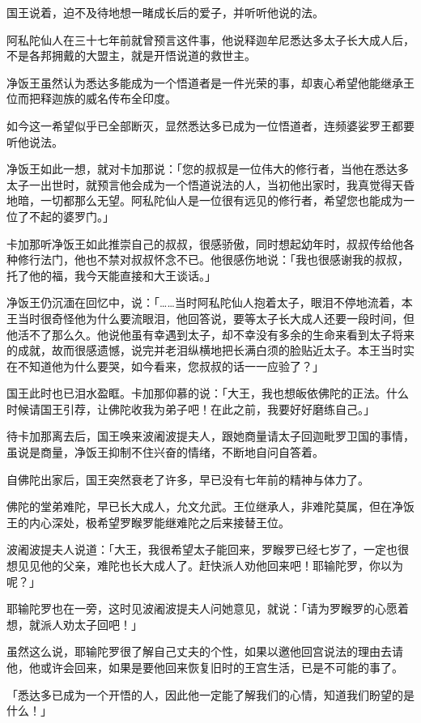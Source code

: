 \documentclass[twoside,openany]{book}
\begin{document}
国王说着，迫不及待地想一睹成长后的爱子，并听听他说的法。

阿私陀仙人在三十七年前就曾预言这件事，他说释迦牟尼悉达多太子长大成人后，不是各邦拥戴的大盟主，就是开悟说道的救世主。

净饭王虽然认为悉达多能成为一个悟道者是一件光荣的事，却衷心希望他能继承王位而把释迦族的威名传布全印度。

如今这一希望似乎已全部断灭，显然悉达多已成为一位悟道者，连频婆娑罗王都要听他说法。

净饭王如此一想，就对卡加那说：「您的叔叔是一位伟大的修行者，当他在悉达多太子一出世时，就预言他会成为一个悟道说法的人，当初他出家时，我真觉得天昏地暗，一切都那么无望。阿私陀仙人是一位很有远见的修行者，希望您也能成为一位了不起的婆罗门。」

卡加那听净饭王如此推崇自己的叔叔，很感骄傲，同时想起幼年时，叔叔传给他各种修行法门，他也不禁对叔叔怀念不已。他很感伤地说：「我也很感谢我的叔叔，托了他的福，我今天能直接和大王谈话。」

净饭王仍沉湎在回忆中，说：「……当时阿私陀仙人抱着太子，眼泪不停地流着，本王当时很奇怪他为什么要流眼泪，他回答说，要等太子长大成人还要一段时间，但他活不了那么久。他说他虽有幸遇到太子，却不幸没有多余的生命来看到太子将来的成就，故而很感遗憾，说完并老泪纵横地把长满白须的脸贴近太子。本王当时实在不知道他为什么要哭，如今看来，您叔叔的话一一应验了？」

国王此时也已泪水盈眶。卡加那仰慕的说：「大王，我也想皈依佛陀的正法。什么时候请国王引荐，让佛陀收我为弟子吧！在此之前，我要好好磨练自己。」

待卡加那离去后，国王唤来波阇波提夫人，跟她商量请太子回迦毗罗卫国的事情，虽说是商量，净饭王抑制不住兴奋的情绪，不断地自问自答着。

自佛陀出家后，国王突然衰老了许多，早已没有七年前的精神与体力了。

佛陀的堂弟难陀，早已长大成人，允文允武。王位继承人，非难陀莫属，但在净饭王的内心深处，极希望罗睺罗能继难陀之后来接替王位。

波阇波提夫人说道：「大王，我很希望太子能回来，罗睺罗已经七岁了，一定也很想见见他的父亲，难陀也长大成人了。赶快派人劝他回来吧！耶输陀罗，你以为呢？」

耶输陀罗也在一旁，这时见波阇波提夫人问她意见，就说：「请为罗睺罗的心愿着想，就派人劝太子回吧！」

虽然这么说，耶输陀罗很了解自己丈夫的个性，如果以邀他回宫说法的理由去请他，他或许会回来，如果是要他回来恢复旧时的王宫生活，已是不可能的事了。

「悉达多已成为一个开悟的人，因此他一定能了解我们的心情，知道我们盼望的是什么！」
\end{document}
